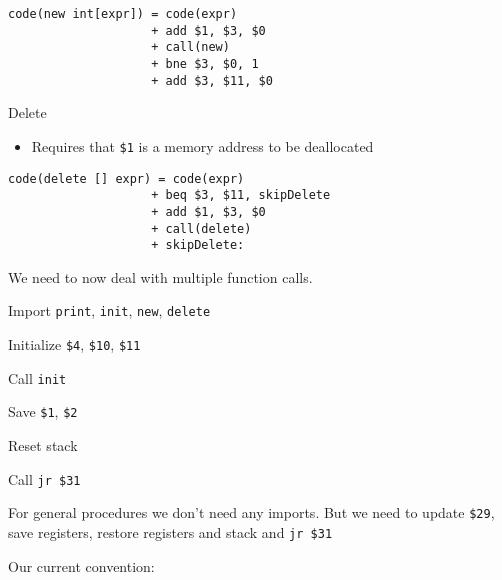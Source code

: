 \documentclass{article}
\begin{document}
\begin{tcolorbox}
\begin{verbatim}
code(new int[expr]) = code(expr)
                    + add $1, $3, $0
                    + call(new)
                    + bne $3, $0, 1
                    + add $3, $11, $0
\end{verbatim}
\end{tcolorbox}

Delete
\begin{itemize}
\item Requires that \texttt{\$1} is a memory address to be
deallocated    
\end{itemize}

\begin{tcolorbox}
\begin{verbatim}
code(delete [] expr) = code(expr)
                    + beq $3, $11, skipDelete
                    + add $1, $3, $0
                    + call(delete)
                    + skipDelete:
\end{verbatim}
\end{tcolorbox}

We need to now deal with multiple function calls.



Import \texttt{print}, \texttt{init}, \texttt{new}, \texttt{delete}

Initialize \texttt{\$4}, \texttt{\$10}, \texttt{\$11}

Call \texttt{init}

Save \texttt{\$1}, \texttt{\$2}

Reset stack

Call \texttt{jr\ \$31}

For general procedures we don't need any imports. But we need to update
\texttt{\$29}, save registers, restore registers and stack and
\texttt{jr\ \$31}




Our current convention:
\end{document}
